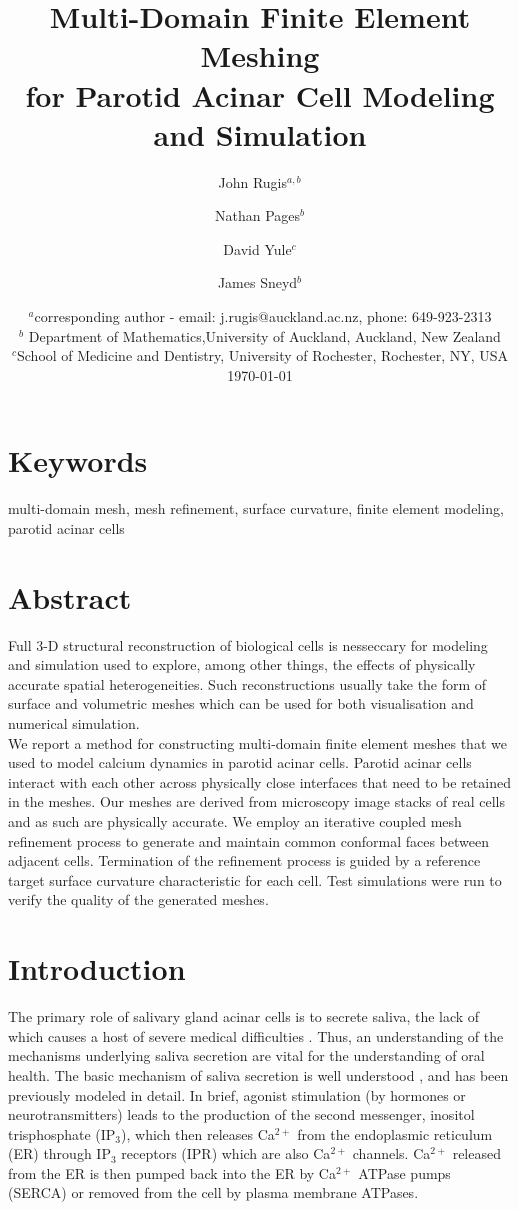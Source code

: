 \documentclass[a4paper,10pt]{article}
\title{Multi-Domain Finite Element Meshing\\for Parotid Acinar Cell Modeling and Simulation}
\author{John Rugis$^{a,b}$ \and Nathan Pages$^b$ \and David Yule$^c$ \and James Sneyd$^b$}
\date{%
  $^a$corresponding author - email: j.rugis@auckland.ac.nz, phone: 649-923-2313\\%
  $^b$ Department of Mathematics,University of Auckland, Auckland, New Zealand\\%
  $^c$School of Medicine and Dentistry, University of Rochester, Rochester, NY, USA\\[2ex]%
  \today
}
\begin{document}
\maketitle

\section*{Keywords}
multi-domain mesh, mesh refinement, surface curvature, finite element modeling, parotid acinar cells\\

\section*{Abstract}
Full 3-D structural reconstruction of biological cells is nesseccary for modeling and simulation used to explore, among other things, the effects of physically accurate spatial heterogeneities. Such reconstructions usually take the form of surface and volumetric meshes which can be used for both visualisation and numerical simulation.\\

We report a method for constructing multi-domain finite element meshes that we used to model calcium dynamics in parotid acinar cells. Parotid acinar cells interact with each other across physically close interfaces that need to be retained in the meshes. Our meshes are derived from microscopy image stacks of real cells and as such are physically accurate. We employ an iterative coupled mesh refinement process to generate and maintain common conformal faces between adjacent cells. Termination of the refinement process is guided by a reference target surface curvature characteristic for each cell. Test simulations were run to verify the quality of the generated meshes.\\

\section{Introduction}
The primary role of salivary gland acinar cells is to secrete saliva, the lack of which causes a host of severe medical difficulties \cite{fox1985,melvin1991}. Thus, an understanding of the mechanisms underlying saliva secretion are vital for the understanding of oral health.  The basic mechanism of saliva secretion is well understood \cite{nauntofte1992}, and has been previously modeled in detail.
In brief, agonist stimulation (by hormones or neurotransmitters) leads to the production of the second messenger, inositol trisphosphate (IP$_3$), which then releases Ca$^{2+}$ from the endoplasmic reticulum (ER) through IP$_3$ receptors (IPR) which are also Ca$^{2+}$ channels. Ca$^{2+}$ released from the ER is then pumped back into the ER by Ca$^{2+}$ ATPase pumps (SERCA) or removed from the cell by plasma membrane ATPases.\\
\end{document}
